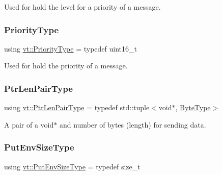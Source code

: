 Used for hold the level for a priority of a message. 

\mbox{\label{namespacevt_a86bff9f556eb761b27fc8600d006ac04}} 
\subsubsection{\texorpdfstring{Priority\+Type}{PriorityType}}
{\footnotesize\ttfamily using \hyperlink{namespacevt_a86bff9f556eb761b27fc8600d006ac04}{vt\+::\+Priority\+Type} = typedef uint16\+\_\+t}



Used for hold the priority of a message. 

\mbox{\label{namespacevt_a97f320a1d3b9b4035e591671cd7d10f0}} 
\subsubsection{\texorpdfstring{Ptr\+Len\+Pair\+Type}{PtrLenPairType}}
{\footnotesize\ttfamily using \hyperlink{namespacevt_a97f320a1d3b9b4035e591671cd7d10f0}{vt\+::\+Ptr\+Len\+Pair\+Type} = typedef std\+::tuple$<$void$\ast$, \hyperlink{namespacevt_aab8d55968084610ce3b17057981e9300}{Byte\+Type}$>$}



A pair of a void$\ast$ and number of bytes (length) for sending data. 

\mbox{\label{namespacevt_aa241444e21c15238e185923792814fe4}} 
\subsubsection{\texorpdfstring{Put\+Env\+Size\+Type}{PutEnvSizeType}}
{\footnotesize\ttfamily using \hyperlink{namespacevt_aa241444e21c15238e185923792814fe4}{vt\+::\+Put\+Env\+Size\+Type} = typedef size\+\_\+t}

\mbox{\label{namespacevt_a494d6c6dc5cdb9a8d61eaedfa2c4d4f3}} 
